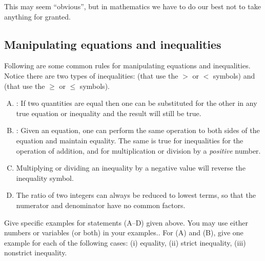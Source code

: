 \noindent
This may seem ``obvious'', but in mathematics we have to do our best not to take anything for granted.

\subsection {Manipulating equations and inequalities}\label{subsec:eqsAndIneqs}

Following are some common rules for manipulating equations and inequalities. Notice there are two types of inequalities:   (that use the $>$ or $<$ symbols) and  (that use the $\ge$ or $\le$ symbols). 

\begin{enumerate}[(A)]
\item
{}: If two quantities are equal then one can be substituted for the other in any true equation or inequality and the result will still be true. 
\item
{}: Given an equation, one can perform the same operation to both sides of the equation and maintain equality.  The same is true for inequalities for the operation of addition, and for multiplication or division by a \emph{positive} number.
\item
{}
Multiplying or dividing an inequality by a negative value will reverse the inequality symbol.
\item
{}
The ratio of two integers can always be reduced to lowest terms, so that the numerator and denominator have no common factors.
\end {enumerate}

\begin{exercise}{4}
Give specific examples for statements (A--D)   given above. You may use either numbers or variables (or both) in your examples.. For (A) and (B), give one example for each of the following cases: (i) equality, (ii) strict inequality, (iii) nonstrict inequality.
\end{exercise}

